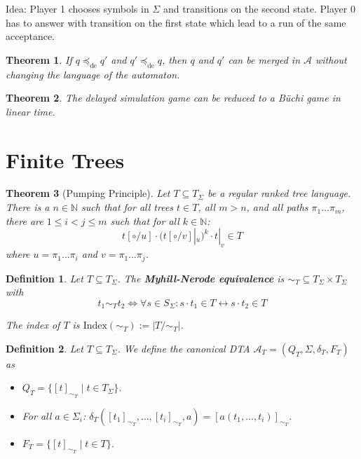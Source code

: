 \documentclass{article}
\newtheorem{theorem}{Theorem}[section]
\newtheorem{definition}{Definition}
\begin{document}
Idea: Player 1 chooses symbols in $\Sigma$ and transitions on the second state. Player 0 has to answer with transition on the first state which lead to a run of the same acceptance.

\begin{theorem}
	If $q \preceq_\text{de} q'$ and $q' \preceq_\text{de} q$, then $q$ and $q'$ can be merged in $\mathcal{A}$ without changing the language of the automaton.
\end{theorem}

\begin{theorem}
	The delayed simulation game can be reduced to a Büchi game in linear time.
\end{theorem}
 

\section{Finite Trees}
\begin{theorem}[Pumping Principle]
	Let $T \subseteq T_\Sigma$ be a regular ranked tree language. There is a $n \in \mathbb{N}$ such that for all trees $t \in T$, all $m > n$, and all paths $\pi_1 \dots \pi_m$, there are $1 \leq i < j \leq m$ such that for all $k \in \mathbb{N}$:
	$$t[\circ / u] \cdot (t[\circ/v]|_u)^k \cdot t|_v \in T$$
	where $u = \pi_1 \dots \pi_i$ and $v = \pi_1 \dots \pi_j$.
\end{theorem}

\begin{definition}
	Let $T \subseteq T_\Sigma$. The \textbf{Myhill-Nerode equivalence} is $\sim_T \subseteq T_\Sigma \times T_\Sigma$ with 
	$$t_1 \sim_T t_2 \Leftrightarrow \forall s \in S_\Sigma: s \cdot t_1 \in T \leftrightarrow s \cdot t_2 \in T$$
	
	The index of $T$ is $\text{Index}(\sim_T) := |T/\sim_T|$.
\end{definition}

\begin{definition}
	Let $T \subseteq T_\Sigma$. We define the canonical DTA $\mathcal{A}_T = (Q_T, \Sigma, \delta_T, F_T)$ as
	\begin{itemize}
		\item $Q_T = \{ [t]_{\sim_T} \mid t \in T_\Sigma \}$.
		\item For all $a \in \Sigma_i$: $\delta_T([t_1]_{\sim_T}, \dots, [t_i]_{\sim_T}, a) = [a(t_1, \dots, t_i)]_{\sim_T}$.
		\item $F_T = \{ [t]_{\sim_T} \mid t \in T \}$.
	\end{itemize}
\end{definition}
\end{document}
